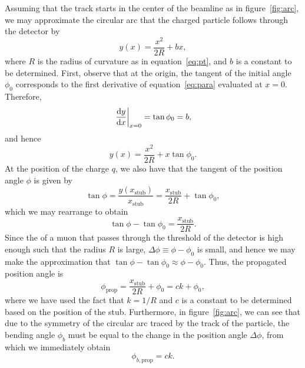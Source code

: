 Assuming that the track starts in the center of the beamline as in figure~\ref{fig:arc}, we may approximate the circular arc that the charged particle follows through the detector by
\begin{equation}\label{eq:para}
  y(x)=\frac{x^2}{2R}+bx,
\end{equation}
where $R$ is the radius of curvature as in equation~\ref{eq:pt}, and $b$ is a constant to be determined.
First, observe that at the origin, the tangent of the initial angle $\phi_0$ corresponds to the first derivative of equation~\ref{eq:para} evaluated at $x=0$.
Therefore,
\begin{equation}
  \eval{\dv{y}{x}}_{x=0}=\tan\phi_0=b,
\end{equation}
and hence
\begin{equation}
  y(x)=\frac{x^2}{2R}+x\tan\phi_0.
\end{equation}
At the position of the charge $q$, we also have that the tangent of the position angle $\phi$ is given by
\begin{equation}
  \tan\phi=\frac{y(x_\mathrm{stub})}{x_\mathrm{stub}}=\frac{x_\mathrm{stub}}{2R}+\tan\phi_0,
\end{equation}
which we may rearrange to obtain
\begin{equation}
  \tan\phi-\tan\phi_0=\frac{x_\mathrm{stub}}{2R}.
\end{equation}
Since the \pt of a muon that passes through the threshold of the detector is high enough such that the radius $R$ is large, $\Delta\phi\equiv\phi-\phi_0$ is small, and hence we may make the approximation that $\tan\phi-\tan\phi_0\approx\phi-\phi_0$.
Thus, the propagated position angle is
\begin{equation}\label{eq:phi}
  \phi_\mathrm{prop}=\frac{x_\mathrm{stub}}{2R}+\phi_0=ck+\phi_0,
\end{equation}
where we have used the fact that $k=1/R$ and $c$ is a constant to be determined based on the position of the stub.
Furthermore, in figure~\ref{fig:arc}, we can see that due to the symmetry of the circular arc traced by the track of the particle, the bending angle $\phi_b$ must be equal to the change in the position angle $\Delta\phi$, from which we immediately obtain
\begin{equation}\label{eq:phib}
  \phi_{b,\mathrm{prop}}=ck.
\end{equation}


